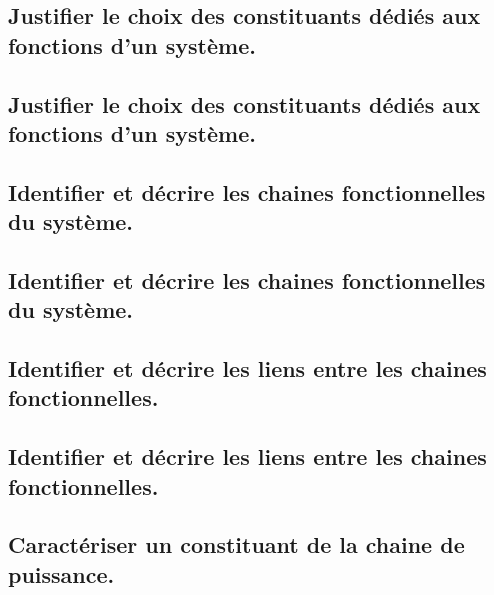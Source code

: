 \documentclass[10pt,fleqn]{book}
\newcommand{\repRel}{../..}
\newcommand{\repStyle}{\repRel/Style}
\newcommand{\td}{fichier_td}
\newcommand{\repExos}{\repRel/ExercicesCompetences}
\newcommand{\repExo}{dossier}
\begin{document}
\renewcommand{\repExo}{\repExos/A3_AnalyseFonctionnelleStructurelle/A3_01_ChaineFonctionnelle/58_Oz440}
\renewcommand{\td}{58_Oz440}
\graphicspath{{\repStyle/png/}{\repExo/images/}}


\renewcommand{\repExo}{\repExos/A3_AnalyseFonctionnelleStructurelle/A3_01_ChaineFonctionnelle/59_Levage}
\renewcommand{\td}{59_Levage}
\graphicspath{{\repStyle/png/}{\repExo/images/}}


\renewcommand{\repExo}{\repExos/A3_AnalyseFonctionnelleStructurelle/A3_01_ChaineFonctionnelle/60_Escalier}
\renewcommand{\td}{60_Escalier}
\graphicspath{{\repStyle/png/}{\repExo/images/}}


\subsection{Justifier le choix des constituants dédiés aux fonctions d’un système.} 

\subsection{Justifier le choix des constituants dédiés aux fonctions d’un système.} 

\subsection{Identifier et décrire les chaines fonctionnelles du système.} 

\subsection{Identifier et décrire les chaines fonctionnelles du système.} 

\subsection{Identifier et décrire les liens entre les chaines fonctionnelles.} 

\subsection{Identifier et décrire les liens entre les chaines fonctionnelles.} 

\subsection{Caractériser un constituant de la chaine de puissance.} 
\end{document}

